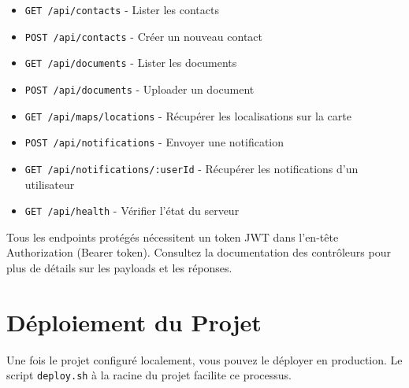 \documentclass[12pt, a4paper]{article}
\begin{document}
\begin{multicols}{2}
\begin{itemize}
  \item \texttt{GET /api/contacts} - Lister les contacts
  \item \texttt{POST /api/contacts} - Créer un nouveau contact
  \item \texttt{GET /api/documents} - Lister les documents
  \item \texttt{POST /api/documents} - Uploader un document
  \item \texttt{GET /api/maps/locations} - Récupérer les localisations sur la carte
  \item \texttt{POST /api/notifications} - Envoyer une notification
  \item \texttt{GET /api/notifications/:userId} - Récupérer les notifications d'un utilisateur
  \item \texttt{GET /api/health} - Vérifier l'état du serveur
\end{itemize}
\end{multicols}

\begin{notebox}
Tous les endpoints protégés nécessitent un token JWT dans l'en-tête Authorization (Bearer token). Consultez la documentation des contrôleurs pour plus de détails sur les payloads et les réponses.
\end{notebox}

\section{Déploiement du Projet}
\label{sec:deployment}
Une fois le projet configuré localement, vous pouvez le déployer en production. Le script \texttt{deploy.sh} à la racine du projet facilite ce processus.
\end{document}
